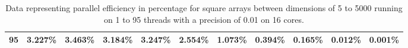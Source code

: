 \begin{table}[ht]
\begin{tabular}{|l|l|l|l|l|l|l|l|l|l|l|}
\textbf{95}      & 3.227\%           & 3.463\%           & 3.184\%           & 3.247\%           & 2.554\%          & 1.073\%          & 0.394\%         & 0.165\%         & 0.012\%         & 0.001\%        \\ \hline
\end{tabular}
\caption{Data representing parallel efficiency in percentage for square arrays between dimensions of 5 to 5000 running on 1 to 95 threads with a precision of 0.01 on 16 cores.}
\end{table}